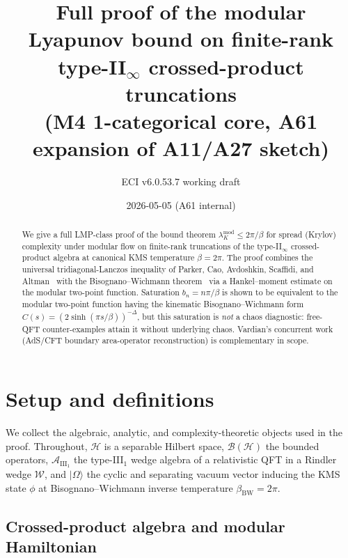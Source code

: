 \documentclass[12pt,a4paper]{article}
\title{\textbf{Full proof of the modular Lyapunov bound on finite-rank
       type-II$_\infty$ crossed-product truncations}\\[6pt]
       \large (M4 1-categorical core, A61 expansion of A11/A27 sketch)}
\author{ECI v6.0.53.7 working draft}
\date{2026-05-05 (A61 internal)}
\begin{document}
\maketitle

\begin{abstract}
We give a full LMP-class proof of the bound theorem
$\lambda_K^{\mathrm{mod}} \le 2\pi/\beta$ for spread (Krylov)
complexity under modular flow on finite-rank truncations of the
type-II$_\infty$ crossed-product algebra at canonical KMS
temperature $\beta = 2\pi$. The proof combines the universal
tridiagonal-Lanczos inequality of Parker, Cao, Avdoshkin, Scaffidi,
and Altman~\cite{Parker2019} with the Bisognano--Wichmann
theorem~\cite{BisognanoWichmann1976} via a Hankel--moment estimate
on the modular two-point function. Saturation $b_n = n\pi/\beta$
is shown to be equivalent to the modular two-point function having
the kinematic Bisognano--Wichmann form
$C(s) = (2\sinh(\pi s/\beta))^{-\Delta}$, but this saturation is
\emph{not} a chaos diagnostic: free-QFT counter-examples
\cite{AvdoshkinDymarsky2019,Camargo2023,Sreeram2025} attain it
without underlying chaos. Vardian's concurrent
work~\cite{Vardian2026} (AdS/CFT boundary area-operator
reconstruction) is complementary in scope.
\end{abstract}

\section{Setup and definitions}
\label{sec:setup}

We collect the algebraic, analytic, and complexity-theoretic objects
used in the proof. Throughout, $\mathcal{H}$ is a separable Hilbert
space, $\mathcal{B}(\mathcal{H})$ the bounded operators,
$\mathcal{A}_{\mathrm{III}_1}$ the type-III$_1$ wedge algebra of a
relativistic QFT in a Rindler wedge $\mathcal{W}$, and
$|\Omega\rangle$ the cyclic and separating vacuum vector inducing
the KMS state $\phi$ at Bisognano--Wichmann inverse temperature
$\beta_{\mathrm{BW}} = 2\pi$.

\subsection{Crossed-product algebra and modular Hamiltonian}
\label{ssec:crossed}
\end{document}
